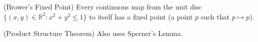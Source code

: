 \begin{theorem}
	(Brower's Fixed Point)  Every continuous map from the unit disc \( \{(x, y) \in \mathbb{R}^{2} : x^{2}+y^{2}\le 1   \}  \) to itself has a fixed point (a point \( p \) such that \( p \mapsto p \)).
\end{theorem}

\begin{theorem}
	(Product Structure Theorem) Also uses Sperner's Lemma.
\end{theorem}
